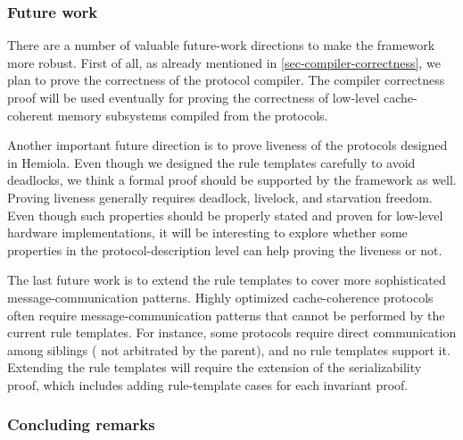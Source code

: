 \subsubsection{Future work}

There are a number of valuable future-work directions to make the \hemiola{} framework more robust.
First of all, as already mentioned in \autoref{sec-compiler-correctness}, we plan to prove the correctness of the protocol compiler.
The compiler correctness proof will be used eventually for proving the correctness of low-level cache-coherent memory subsystems compiled from the \hemiola{} protocols.

Another important future direction is to prove liveness of the protocols designed in Hemiola.
Even though we designed the rule templates carefully to avoid deadlocks, we think a formal proof should be supported by the framework as well.
Proving liveness generally requires deadlock, livelock, and starvation freedom.
Even though such properties should be properly stated and proven for low-level hardware implementations, it will be interesting to explore whether some properties in the protocol-description level can help proving the liveness or not.

The last future work is to extend the rule templates to cover more sophisticated message-communication patterns.
Highly optimized cache-coherence protocols often require message-communication patterns that cannot be performed by the current rule templates.
For instance, some protocols require direct communication among siblings (\ie{} not arbitrated by the parent), and no rule templates support it.
Extending the rule templates will require the extension of the serializability proof, which includes adding rule-template cases for each invariant proof.

\subsubsection{Concluding remarks}

